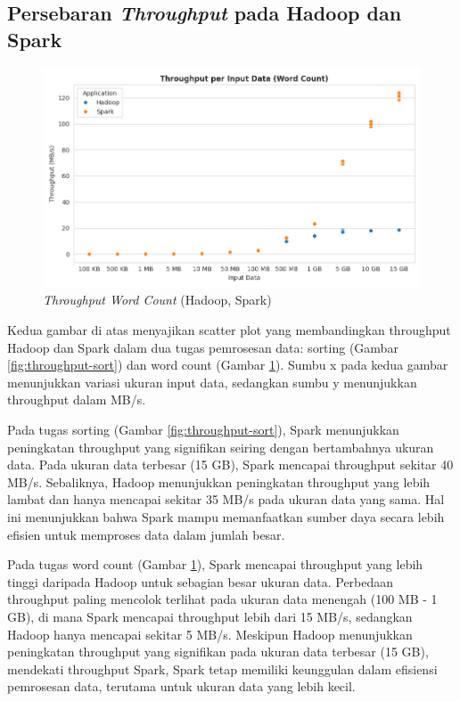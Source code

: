 \subsection {Persebaran \textit{Throughput} pada Hadoop dan Spark}

\begin{figure}[h]
    \centering
    \includegraphics[width=1\textwidth]{figures/ch04/1-throughput-wordcount.png}
    \caption{\textit{Throughput Word Count} (Hadoop, Spark)}
    \label{fig:throughput-wordcount}
\end{figure}
Kedua gambar di atas menyajikan scatter plot yang membandingkan throughput Hadoop dan Spark dalam dua tugas pemrosesan data: sorting (Gambar \ref{fig:throughput-sort}) dan word count (Gambar \ref{fig:throughput-wordcount}). Sumbu x pada kedua gambar menunjukkan variasi ukuran input data, sedangkan sumbu y menunjukkan throughput dalam MB/s. 

Pada tugas sorting (Gambar \ref{fig:throughput-sort}), Spark menunjukkan peningkatan throughput yang signifikan seiring dengan bertambahnya ukuran data. Pada ukuran data terbesar (15 GB), Spark mencapai throughput sekitar 40 MB/s. Sebaliknya, Hadoop menunjukkan peningkatan throughput yang lebih lambat dan hanya mencapai sekitar 35 MB/s pada ukuran data yang sama. Hal ini menunjukkan bahwa Spark mampu memanfaatkan sumber daya secara lebih efisien untuk memproses data dalam jumlah besar.

Pada tugas word count (Gambar \ref{fig:throughput-wordcount}), Spark mencapai throughput yang lebih tinggi daripada Hadoop untuk sebagian besar ukuran data. Perbedaan throughput paling mencolok terlihat pada ukuran data menengah (100 MB - 1 GB), di mana Spark mencapai throughput lebih dari 15 MB/s, sedangkan Hadoop hanya mencapai sekitar 5 MB/s. Meskipun Hadoop menunjukkan peningkatan throughput yang signifikan pada ukuran data terbesar (15 GB), mendekati throughput Spark, Spark tetap memiliki keunggulan dalam efisiensi pemrosesan data, terutama untuk ukuran data yang lebih kecil.

